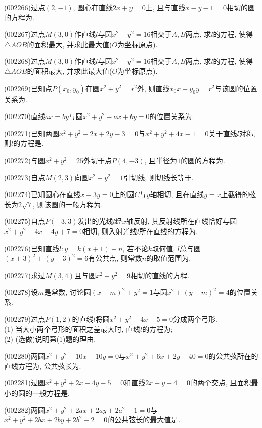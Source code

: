 \item (002266)过点$(2,-1)$, 圆心在直线$2x+y=0$上, 且与直线$x-y-1=0$相切的圆的方程为.
\item (002267)过点$M(3,0)$作直线$l$与圆$x^2+y^2=16$相交于$A,B$两点, 求$l$的方程, 使得$\triangle AOB$的面积最大, 并求此最大值($O$为坐标原点).
\item (002268)过点$M(3,0)$作直线$l$与圆$x^2+y^2=16$相交于$A,B$两点, 求$l$的方程, 使得$\triangle AOB$的面积最大, 并求此最大值($O$为坐标原点).
\item (002269)已知点$P(x_0,y_0)$在圆$x^2+y^2=r^2$外, 则直线$x_0x+y_0y=r^2$与该圆的位置关系为.
\item (002270)直线$ax=by$与圆$x^2+y^2-ax+by=0$的位置关系为.
\item (002271)已知两圆$x^2+y^2-2x+2y-3=0$与$x^2+y^2+4x-1=0$关于直线$l$对称, 则$l$的方程是.
\item (002272)与圆$x^2+y^2=25$外切于点$P(4,-3)$, 且半径为$1$的圆的方程为.
\item (002273)自点$M(2,3)$向圆$x^2+y^2=1$引切线, 则切线长等于.
\item (002274)已知圆心在直线$x-3y=0$上的圆$C$与$y$轴相切, 且在直线$y=x$上截得的弦长为$2\sqrt{7}$, 则该圆的一般方程为.
\item (002275)自点$P(-3,3)$发出的光线$l$经$x$轴反射, 其反射线所在直线恰好与圆$x^2+y^2-4x-4y+7=0$相切, 则入射光线$l$所在直线的方程为.
\item (002276)已知直线$l:y=k(x+1)+n$, 若不论$k$取何值, $l$总与圆${{(x+3)}^{2}}+{{(y-3)}^{2}}=6$有公共点,
则常数$n$的取值范围为.
\item (002277)求过$M(3,4)$且与圆$x^2+y^2=9$相切的直线的方程.
\item (002278)设$m$是常数, 讨论圆$(x-m)^2+y^2=1$与圆$x^2+(y-m)^2=4$的位置关系.
\item (002279)过点$P(1,2)$的直线$l$将圆$x^2+y^2-4x-5=0$分成两个弓形.\\ 
(1) 当大小两个弓形的面积之差最大时, 直线$l$的方程为;\\ 
(2) (选做)说明第(1)题的理由.
\item (002280)两圆$x^2+y^2-10x-10y=0$与$x^2+y^2+6x+2y-40=0$的公共弦所在的直线方程为, 公共弦长为.
\item (002281)过圆$x^2+y^2+2x-4y-5=0$和直线$2x+y+4=0$的两个交点, 且面积最小的圆的一般方程是.
\item (002282)两圆$x^2+y^2+2ax+2ay+2a^2-1=0$与$x^2+y^2+2bx+2by+2b^2-2=0$的公共弦长的最大值是.
